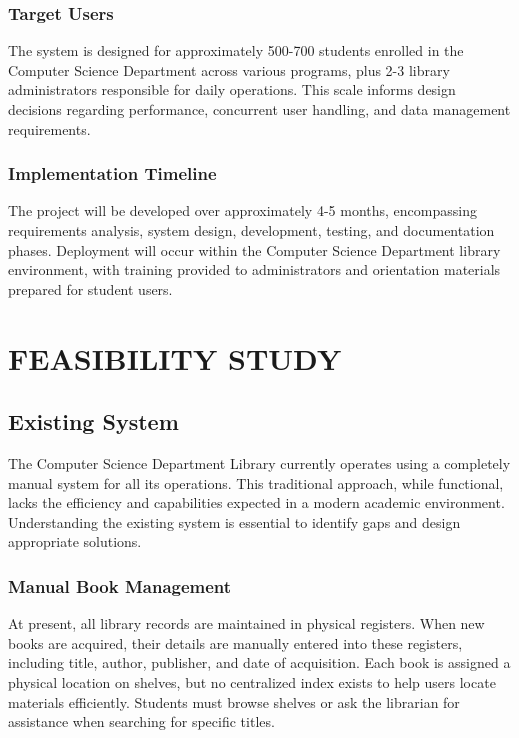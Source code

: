\documentclass[12pt,a4paper]{report}
\begin{document}
\subsection{Target Users}

The system is designed for approximately 500-700 students enrolled in the Computer Science Department across various programs, plus 2-3 library administrators responsible for daily operations. This scale informs design decisions regarding performance, concurrent user handling, and data management requirements.

\subsection{Implementation Timeline}

The project will be developed over approximately 4-5 months, encompassing requirements analysis, system design, development, testing, and documentation phases. Deployment will occur within the Computer Science Department library environment, with training provided to administrators and orientation materials prepared for student users.

\newpage
\chapter{FEASIBILITY STUDY}

\section{Existing System}
\label{sec:existing}

The Computer Science Department Library currently operates using a completely manual system for all its operations. This traditional approach, while functional, lacks the efficiency and capabilities expected in a modern academic environment. Understanding the existing system is essential to identify gaps and design appropriate solutions.

\subsection{Manual Book Management}

At present, all library records are maintained in physical registers. When new books are acquired, their details are manually entered into these registers, including title, author, publisher, and date of acquisition. Each book is assigned a physical location on shelves, but no centralized index exists to help users locate materials efficiently. Students must browse shelves or ask the librarian for assistance when searching for specific titles.
\end{document}
